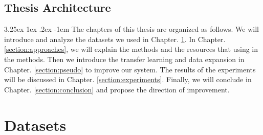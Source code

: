 \documentclass[12pt]{article}
\makeatletter
\renewcommand\paragraph{\@startsection{paragraph}{5}{\z@}%
  {3.25ex \@plus1ex \@minus.2ex}%
  {-1em}%
  {\normalfont\normalsize\bfseries}}
\makeatother
\begin{document}
\begin{CJK*}{UTF8}{bkai}
\begin{spacing}{1.77}


\subsection{Thesis Architecture}
\paragraph{}
The chapters of this thesis are organized as follows. We will introduce and analyze the datasets we used in Chapter. \ref{section:datasets}. In Chapter. \ref{section:approaches}, we will explain the methods and the resources that using in the methods. Then we introduce the transfer learning and data expansion in Chapter. \ref{section:pseudo} to improve our system. The results of the experiments will be discussed in Chapter. \ref{section:experiments}. Finally, we will conclude in Chapter. \ref{section:conclusion} and propose the direction of improvement.

\section{Datasets} \label{section:datasets}


\end{spacing}
\end{CJK*}
\end{document}
